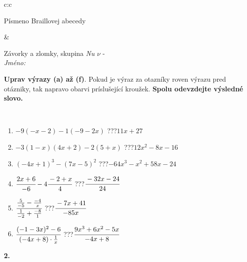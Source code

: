 \documentclass[10pt]{report}
\begin{document}
\begin{tabular}{c:c}
\begin{minipage}[c][104.5mm][t]{0.5\linewidth}
\begin{center}
\begin{minipage}{0.20\linewidth}
\begin{center}
{\small Písmeno Braillovej abecedy}
\end{center}
\end{minipage}
\end{center}
\end{minipage}
&
\begin{minipage}[c][104.5mm][t]{0.5\linewidth}
\begin{center}
\vspace{7mm}
{\huge Závorky a zlomky, skupina \textit{Nu $\nu$} -}\\[5mm]
\textit{Jméno:}\phantom{xxxxxxxxxxxxxxxxxxxxxxxxxxxxxxxxxxxxxxxxxxxxxxxxxxxxxxxxxxxxxxxxx}\\[5mm]
\begin{minipage}{0.95\linewidth}
\begin{center}
\textbf{Uprav výrazy (a) až (f)}. Pokud je výraz za otazníky roven výrazu pred otázniky, tak napravo obarvi príslušející kroužek. \textbf{Spolu odevzdejte výsledné slovo.}
\end{center}
\end{minipage}
\\[1mm]
\begin{minipage}{0.79\linewidth}
\begin{center}
\begin{varwidth}{\linewidth}
\begin{enumerate}
\normalsize
\item $-9(-x-2)-1(-9-2x)$\quad \dotfill\; ???\;\dotfill \quad $11x+27$
\item $-3(1-x)(4x+2)-2(5+x)$\quad \dotfill\; ???\;\dotfill \quad $12x^2-8x-16$
\item $(-4x+1)^3-(7x-5)^2$\quad \dotfill\; ???\;\dotfill \quad $-64x^3-x^2+58x-24$
\item $\cfrac{2x+6}{-6}-4\cfrac{-2+x}{4}$\quad \dotfill\; ???\;\dotfill \quad $\cfrac{-32x-24}{24}$
\item $\cfrac{\frac{5}{-5}-\frac{-4}{x}}{\frac{1}{-2}+\frac{-8}{1}}$\quad \dotfill\; ???\;\dotfill \quad $\cfrac{-7x+41}{-85x}$
\item $\cfrac{(-1-3x)^2-6}{(-4x+8)\cdot\frac{1}{x}}$\quad \dotfill\; ???\;\dotfill \quad $\cfrac{9x^3+6x^2-5x}{-4x+8}$
\end{enumerate}
\end{varwidth}
\end{center}
\end{minipage}
\begin{minipage}{0.20\linewidth}
\begin{center}
{\Huge\bfseries 2.} \\[2mm]

\end{center}
\end{minipage}
\end{center}
\end{minipage}
\end{tabular}
\end{document}
